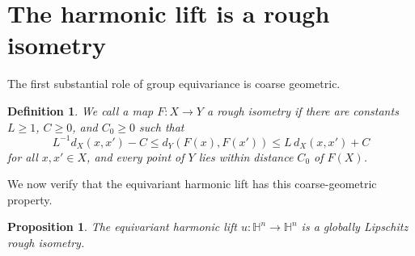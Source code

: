 \documentclass[11pt]{amsart}
\newcommand{\SuggestedDelete}[1]{{\hypersetup{linkcolor=red,citecolor=red,urlcolor=red}\color{red}#1}}
\newcommand{\ReviewUnusedLabel}[1]{%
  \par\noindent
  \SuggestedDelete{\textup{\scriptsize Unused label: \texttt{\detokenize{\label{#1}}}}}%
  \par}
\theoremstyle{plain}
\newtheorem{proposition}[theorem]{Proposition}
\theoremstyle{plain}
\newtheorem{definition}[theorem]{Definition}
\theoremstyle{plain}
\newcommand{\Hn}{\mathbb H^n}
\numberwithin{equation}{section}
\begin{document}
\section{The harmonic lift is a rough isometry}

The first substantial role of group equivariance is coarse geometric.

\begin{definition}\label{def:rough-isometry}
We call a map \(F:X\to Y\) a \emph{rough isometry} if there are constants
\(L\geq1\), \(C\geq0\), and \(C_0\geq0\) such that
\begin{equation}\label{eq:general-rough-isometry-bounds}
L^{-1}d_X(x,x')-C
\leq
d_Y(F(x),F(x'))
\leq
L\,d_X(x,x')+C
\end{equation}
for all \(x,x'\in X\), and every point of \(Y\) lies within distance
\(C_0\) of \(F(X)\).
\end{definition}

We now verify that the equivariant harmonic lift has this coarse-geometric
property.

\begin{proposition}\label{prop:rough}
The equivariant harmonic lift \(u:\Hn\to\Hn\) is a globally Lipschitz rough
isometry.
\end{proposition}
\end{document}
